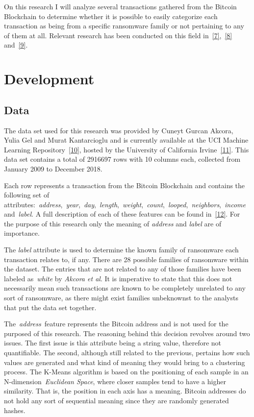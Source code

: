 \documentclass[10pt]{article}
\begin{document}
On this research I will analyze several transactions gathered from the
Bitcoin Blockchain to determine whether it is possible to easily
categorize each transaction as being from a specific ransomware family
or not pertaining to any of them at all. Relevant research has been
conducted on this field in~\hyperref[csl:7]{[7]},~\hyperref[csl:8]{[8]}
and~\hyperref[csl:9]{[9]}.~

\section*{\texorpdfstring{{Development}}{Development}}

{\label{698162}}

\subsection*{\texorpdfstring{{Data}}{Data}}

{\label{472478}}

The data set used for this research was provided by Cuneyt Gurcan
Akcora, Yulia Gel and Murat Kantarcioglu and is currently available at
the UCI Machine Learning Repository~\hyperref[csl:10]{[10]}, hosted by the
University of California Irvine~\hyperref[csl:11]{[11]}. This data set
contains a total of 2916697 rows with 10 columns each, collected from
January 2009 to December 2018.~

Each row represents a transaction from the Bitcoin Blockchain and
contains the following set of
attributes:~\emph{address},~\emph{year},~\emph{day},~\emph{length},~\emph{weight},~\emph{count},~\emph{looped},~\emph{neighbors},~\emph{income}
and~\emph{label}. A full description of each of these features can be
found in~\hyperref[csl:12]{[12]}. For the purpose of this research only the
meaning of \emph{address} and \emph{label} are of importance.~

The \emph{label} attribute is used to determine the known family of
ransomware each transaction relates to, if any. There are 28 possible
families of ransomware within the dataset. The entries that are not
related to any of those families have been labeled as~\emph{white} by
\emph{Akcora et al}. It is imperative to state that this does not
necessarily mean such transactions are known to be completely unrelated
to any sort of ransomware, as there might exist families unbeknownst to
the analysts that put the data set together.

The~\emph{address}~feature represents the Bitcoin address and is not
used for the purposed of this research. The reasoning behind this
decision revolves around two issues. The first issue is this attribute
being a string value, therefore not quantifiable. The second, although
still related to the previous, pertains how such values are generated
and what kind of meaning they would bring to a clustering process. The
K-Means algorithm is based on the positioning of each sample in an
N-dimension~\emph{Euclidean Space}, where closer samples tend to have a
higher similarity. That is, the position in each axis has a meaning.
Bitcoin addresses do not hold any sort of sequential meaning since they
are randomly generated hashes.
\end{document}
